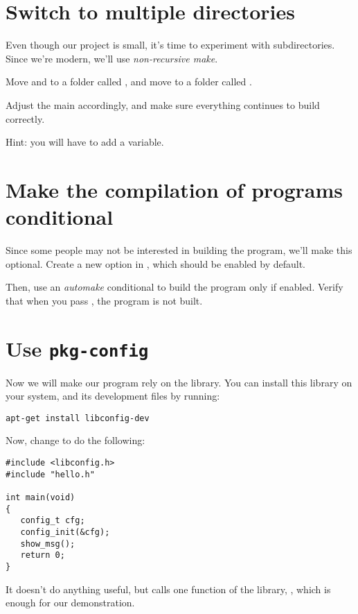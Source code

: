 \section{Switch to multiple directories}

Even though our project is small, it's time to experiment with
subdirectories. Since we're modern, we'll use {\em non-recursive
  make}.

Move  and  to a folder called ,
and move  to a folder called .

Adjust the main  accordingly, and make sure
everything continues to build correctly.

Hint: you will have to add a  variable.

\section{Make the compilation of programs conditional}

Since some people may not be interested in building the 
program, we'll make this optional. Create a new
 option in , which should
be enabled by default.

Then, use an {\em automake} conditional to build the 
program only if enabled. Verify that when you pass
, the  program is not built.

\section{Use {\tt pkg-config}}

Now we will make our program rely on the  library. You
can install this library on your system, and its development files by
running:

\begin{verbatim}
apt-get install libconfig-dev
\end{verbatim}

Now, change  to do the following:

\begin{verbatim}
#include <libconfig.h>
#include "hello.h"

int main(void)
{
   config_t cfg;
   config_init(&cfg);
   show_msg();
   return 0;
}
\end{verbatim}

It doesn't do anything useful, but calls one function of the
 library, , which is enough for our
demonstration.

